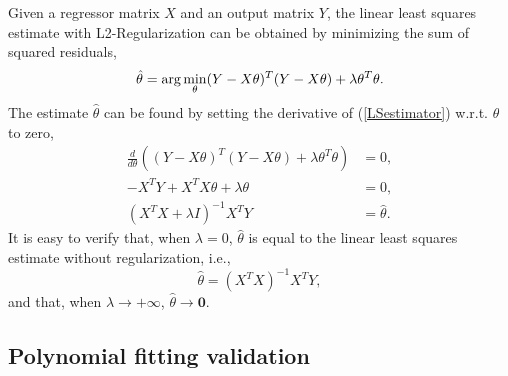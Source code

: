 \documentclass[]{article}
\begin{document}
Given a regressor matrix $X$ and an output matrix $Y$, the linear least squares estimate with L2-Regularization can be obtained by minimizing the sum of squared residuals,
\begin{equation}{\label{LSestimator}}
\hat{\theta} = \arg\min\limits_{\theta}(Y-X\theta)^T(Y-X\theta)+\lambda\theta^T\theta.
\end{equation}
The estimate $\hat{\theta}$ can be found by setting the derivative of (\ref{LSestimator}) w.r.t. $\theta$ to zero,
\begin{subequations}\label{LSderivative}
		\begin{align}
		\frac{d}{d\theta}\left((Y-X\theta)^T(Y-X\theta)+\lambda\theta^T\theta \right) &= 0,\\
		-X^TY+X^TX\theta+\lambda\theta &=0,\\
		(X^TX+\lambda I)^{-1}X^TY &=\hat{\theta}.
		\end{align}
\end{subequations}
It is easy to verify that, when $\lambda=0$, $\hat{\theta}$ is equal to the linear least squares estimate without regularization, i.e.,
\begin{equation}
\hat{\theta} = (X^TX)^{-1}X^TY,
\end{equation}
and that, when $\lambda\rightarrow +\infty$, $\hat{\theta}\rightarrow \mathbf{0}$.


\subsection{Polynomial fitting validation}
\end{document}
